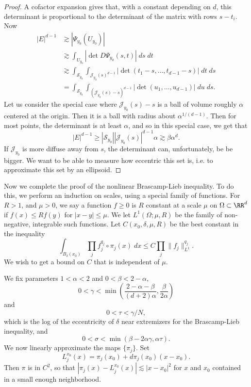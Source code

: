 \begin{proof}
    A cofactor expansion gives that, with a constant depending on $d$, this determinant is proportional to the determinant of the matrix with rows $s - t_i$. Now
    \begin{align*}
        |E|^{d-1} &\gtrsim |\Psi_{y_0}(U_{y_0})|\\
        &\gtrsim \int_{U_{y_0}} |\det D \Psi_{y_0}(s,t)|\; ds\; dt\\
        &\gtrsim \int_{\mathcal{S}_{y_0}} \int_{\mathcal{J}_{y_0}(s)^{d-1}} |\det(t_1-s, \dots, t_{d-1} - s)|\; dt\; ds\\
        &= \int_{\mathcal{S}_{y_0}} \int_{(\mathcal{J}_{y_0}(s) - s)^{d-1}} |\det(u_1,\dots,u_{d-1})|\; du\; ds.
    \end{align*}
    Let us consider the special case where $\mathcal{J}_{y_0}(s) - s$ is a ball of volume roughly $\alpha$ centered at the origin. Then it is a ball with radius about $\alpha^{1/(d-1)}$. Then for most points, the determinant is at least $\alpha$, and so in this special case, we get that
    \[ |E|^{d-1} \geq |\mathcal{S}_{y_0}| |\mathcal{J}_{y_0}(s)|^{d-1} \alpha \gtrsim \beta \alpha^d. \]
    If $\mathcal{J}_{y_0}$ is more diffuse away from $s$, the determinant can, unfortunately, be be bigger. We want to be able to measure how eccentric this set is, i.e. to approximate this set by an ellipsoid.
\end{proof}

Now we complete the proof of the nonlinear Brascamp-Lieb inequality. To do this, we perform an induction on scales, using a special family of functions. For $R > 1$, and $\mu > 0$, we say a function $f \geq 0$ is $R$ constant at a scale $\mu$ on $\Omega \subset \RR^d$ if $f(x) \leq R f(y)$ for $|x - y| \leq \mu$. We let $L^1(\Omega;\mu,R)$ be the family of non-negative, integrable such functions. Let $C(x_0,\delta,\mu,R)$ be the best constant in the inequality
%
\[ \int_{B_\delta(x_0)} \prod_j f_j^{q_j} \circ \pi_j(x)\; dx \leq C \prod_j \| f_j \|_{L^1}^{q_j}. \]
%
We wish to get a bound on $C$ that is independent of $\mu$.

We fix parameters $1 < \alpha < 2$ and $0 < \beta < 2 - \alpha$,
%
\[ 0 < \gamma < \min \left( \frac{2 - \alpha - \beta}{(d+2)\alpha}, \frac{\beta}{2\alpha} \right) \]
%
and
%
\[ 0 < \tau < \gamma / N, \]
which is the log of the eccentricity of $\delta$ near extremizers for the Brascamp-Lieb inequality, and
%
\[ 0 < \sigma < \min( \beta - 2\alpha \gamma, \alpha \tau ). \]
%
We now linearly approximate the maps $\{ \pi_j \}$. Set
%
\[ L_j^{x_0}(x) = \pi_j(x_0) + d\pi_j(x_0)(x - x_0). \]
%
Then $\pi$ is in $C^2$, so that $|\pi_j(x) - L_j^{x_0}(x)| \lesssim |x - x_0|^2$ for $x$ and $x_0$ contained in a small enough neighborhood.

